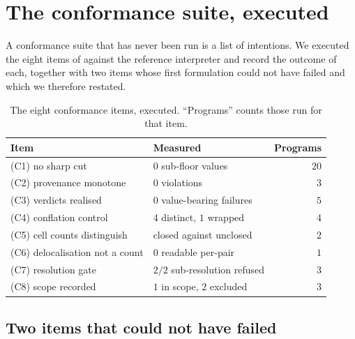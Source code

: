 \documentclass[11pt,twocolumn,a4paper]{article}
\theoremstyle{thmstyle}
\theoremstyle{definition}
\theoremstyle{remark}
\begin{document}
\section{The conformance suite, executed}
\label{sec:conformance-run}

A conformance suite that has never been run is a list of intentions. We
executed the eight items of  against the reference interpreter
and record the outcome of each, together with two items whose first
formulation could not have failed and which we therefore restated.

\begin{table}[htbp]
\centering\small
\caption{The eight conformance items, executed. ``Programs'' counts
those run for that item.}
\label{tab:conformance}
\begin{tabular}{@{}llr@{}}
\toprule
Item & Measured & Programs\\
\midrule
(C1) no sharp cut & $0$ sub-floor values & $20$\\
(C2) provenance monotone & $0$ violations & $3$\\
(C3) verdicts realised & $0$ value-bearing failures & $5$\\
(C4) conflation control & $4$ distinct, $1$ wrapped & $4$\\
(C5) cell counts distinguish & closed against unclosed & $2$\\
(C6) delocalisation not a count & $0$ readable per-pair & $1$\\
(C7) resolution gate & $2/2$ sub-resolution refused & $3$\\
(C8) scope recorded & $1$ in scope, $2$ excluded & $3$\\
\bottomrule
\end{tabular}
\end{table}

\subsection{Two items that could not have failed}
\end{document}
